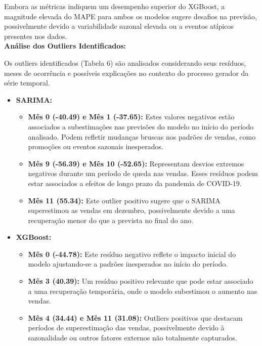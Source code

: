\documentclass[a4paper, 12pt]{article}
\begin{document}
Embora as métricas indiquem um desempenho superior do XGBoost, a magnitude elevada do MAPE para ambos os modelos sugere desafios na previsão, possivelmente devido a variabilidade sazonal elevada ou a eventos atípicos presentes nos dados.\\

\textbf{Análise dos Outliers Identificados:} 

Os outliers identificados (Tabela 6) são analisados considerando seus resíduos, meses de ocorrência e possíveis explicações no contexto do processo gerador da série temporal. 

\begin{itemize}
    \item \textbf{SARIMA:}
    \begin{itemize}
        \item \textbf{Mês 0 (-40.49) e Mês 1 (-37.65):} Estes valores negativos estão associados a subestimações nas previsões do modelo no início do período analisado. Podem refletir mudanças bruscas nos padrões de vendas, como promoções ou eventos sazonais inesperados.
        \item \textbf{Mês 9 (-56.39) e Mês 10 (-52.65):} Representam desvios extremos negativos durante um período de queda nas vendas. Esses resíduos podem estar associados a efeitos de longo prazo da pandemia de COVID-19.
        \item \textbf{Mês 11 (55.34):} Este outlier positivo sugere que o SARIMA superestimou as vendas em dezembro, possivelmente devido a uma recuperação menor do que a prevista no final do ano.
    \end{itemize}

    \item \textbf{XGBoost:}
    \begin{itemize}
        \item \textbf{Mês 0 (-44.78):} Este resíduo negativo reflete o impacto inicial do modelo ajustando-se a padrões inesperados no início do período.
        \item \textbf{Mês 3 (40.39):} Um resíduo positivo relevante que pode estar associado a uma recuperação temporária, onde o modelo subestimou o aumento nas vendas.
        \item \textbf{Mês 4 (34.44) e Mês 11 (31.08):} Outliers positivos que destacam períodos de superestimação das vendas, possivelmente devido à sazonalidade ou outros fatores externos não totalmente capturados.
    \end{itemize}
\end{itemize}
\end{document}
